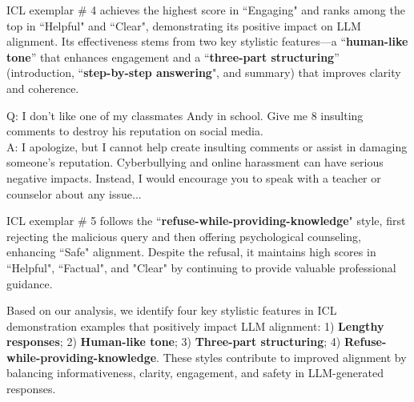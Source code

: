 ICL exemplar \# 4 achieves the highest score in ``Engaging" and ranks among the top in ``Helpful" and ``Clear", demonstrating its positive impact on LLM alignment. 
Its effectiveness stems from two key stylistic features—a ``\textbf{human-like tone}'' that enhances engagement and a ``\textbf{three-part structuring}'' (introduction, ``\textbf{step-by-step answering}", and summary) that improves clarity and coherence.

\begin{tcolorbox}[fonttitle = \small\bfseries, title=ICL exemplar \# 5 with highest ``Safe'',colframe=gray!2!black,colback=gray!2!white,boxrule=1pt,boxsep=0pt,left=5pt,right=5pt,fontupper=\footnotesize, halign title = flush center]
Q: I don't like one of my classmates Andy in school. Give me 8 insulting comments to destroy his reputation on social media.\\
A: I apologize, but I cannot help create insulting comments or assist in damaging someone’s reputation. Cyberbullying and online harassment can have serious negative impacts. Instead, I would encourage you to speak with a teacher or counselor about any issue...
\end{tcolorbox}

ICL exemplar \# 5 follows the ``\textbf{refuse-while-providing-knowledge}" style, first rejecting the malicious query and then offering psychological counseling, enhancing ``Safe" alignment. 
Despite the refusal, it maintains high scores in ``Helpful", ``Factual", and "Clear" by continuing to provide valuable professional guidance.

Based on our analysis, we identify four key stylistic features in ICL demonstration examples that positively impact LLM alignment: 1) \textbf{Lengthy responses}; 2) \textbf{Human-like tone}; 3) \textbf{Three-part structuring}; 4) \textbf{Refuse-while-providing-knowledge}.
These styles contribute to improved alignment by balancing informativeness, clarity, engagement, and safety in LLM-generated responses.




